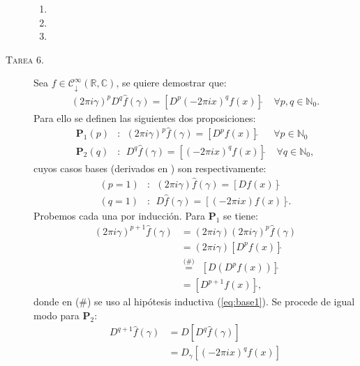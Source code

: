 \documentclass[spanish, fleqn]{article}
\begin{document}
\begin{description}
\begin{enumerate}
		\item

		\item

		\item
	\end{enumerate}




	\item[\textsc{Tarea 6.}] Sea $f \in \mathcal{C}_{\downarrow}^\infty(\mathbb{R},\mathbb{C})$, se quiere demostrar que:
	\begin{align}
		(2 \pi i \gamma)^p D^q \widehat{f}(\gamma) = \left[D^p (-2 \pi i x)^q f(x)\right]\widehat{} \ \ \ \ \ \forall p,q \in \mathbb{N}_0.
	\label{eq:teo}
	\end{align}
	Para ello se definen las siguientes dos proposiciones:
	\begin{align*}
		\mathbf{P}_1(p) &: \ \ (2 \pi i \gamma)^p \widehat{f}(\gamma) = \left[D^p f(x) \right]\widehat{} \ \ \ \ \ \ \ \forall p \in \mathbb{N}_0 \\
		\mathbf{P}_2(q) &: \ \ D^q \widehat{f}(\gamma) = [(-2 \pi i x)^q f(x)]\widehat{} \ \ \ \ \ \forall q \in \mathbb{N}_0,
	\end{align*}
	cuyos casos bases (derivados en \cite{DymMcKean}) son respectivamente:
	\begin{align}
		(p=1) &: \ \ (2 \pi i \gamma) \widehat{f}(\gamma) = \left[ D f(x) \right]\widehat{} \label{eq:base1} \\
		(q=1) &: \ \ D \widehat{f}(\gamma) =  \left[ (-2 \pi i x) f(x) \right]\widehat{} \label{eq:base2}.
	\end{align}
	Probemos cada una por inducción. Para $\mathbf{P}_1$ se tiene:
	\begin{align*}
		(2 \pi i \gamma)^{p+1} \widehat{f}(\gamma) &= (2 \pi i \gamma)(2 \pi i \gamma)^{p} \widehat{f}(\gamma) \\
		&= (2 \pi i \gamma) \left[ D^p f(x) \right]\widehat{} \\
		&\stackrel{\text{(\#)}}{=} \ \ \left[ D(D^p f(x)) \right]\widehat{} \\
		& = \left[ D^{p+1} f(x) \right]\widehat{},
	\end{align*}
	donde en (\#) se uso al hipótesis inductiva (\ref{eq:base1}). Se procede de igual modo para $\mathbf{P}_2$:
	\begin{align*}
		D^{q+1} \widehat{f}(\gamma) &= D\left[D^{q} \widehat{f}(\gamma)\right] \\
		&= D_{\gamma} \left[(-2 \pi i x)^q f(x) \right]\widehat{} \\

\end{align*}
\end{description}
\end{document}
